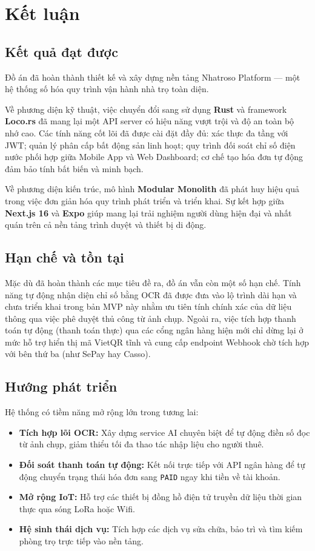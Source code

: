 \chapter{Kết luận}\label{chapter_conclusion}

\section{Kết quả đạt được}

Đồ án đã hoàn thành thiết kế và xây dựng nền tảng Nhatroso Platform --- một hệ thống số hóa quy trình vận hành nhà trọ toàn diện.

Về phương diện kỹ thuật, việc chuyển đổi sang sử dụng \textbf{Rust} và framework \textbf{Loco.rs} đã mang lại một API server có hiệu năng vượt trội và độ an toàn bộ nhớ cao. Các tính năng cốt lõi đã được cài đặt đầy đủ: xác thực đa tầng với JWT; quản lý phân cấp bất động sản linh hoạt; quy trình đối soát chỉ số điện nước phối hợp giữa Mobile App và Web Dashboard; cơ chế tạo hóa đơn tự động đảm bảo tính bất biến và minh bạch.

Về phương diện kiến trúc, mô hình \textbf{Modular Monolith} đã phát huy hiệu quả trong việc đơn giản hóa quy trình phát triển và triển khai. Sự kết hợp giữa \textbf{Next.js 16} và \textbf{Expo} giúp mang lại trải nghiệm người dùng hiện đại và nhất quán trên cả nền tảng trình duyệt và thiết bị di động.

\section{Hạn chế và tồn tại}

Mặc dù đã hoàn thành các mục tiêu đề ra, đồ án vẫn còn một số hạn chế. Tính năng tự động nhận diện chỉ số bằng OCR đã được đưa vào lộ trình dài hạn và chưa triển khai trong bản MVP này nhằm ưu tiên tính chính xác của dữ liệu thông qua việc phê duyệt thủ công từ ảnh chụp. Ngoài ra, việc tích hợp thanh toán tự động (thanh toán thực) qua các cổng ngân hàng hiện mới chỉ dừng lại ở mức hỗ trợ hiển thị mã VietQR tĩnh và cung cấp endpoint Webhook chờ tích hợp với bên thứ ba (như SePay hay Casso).

\section{Hướng phát triển}

Hệ thống có tiềm năng mở rộng lớn trong tương lai:
\begin{itemize}
    \item \textbf{Tích hợp lõi OCR:} Xây dựng service AI chuyên biệt để tự động điền số đọc từ ảnh chụp, giảm thiểu tối đa thao tác nhập liệu cho người thuê.
    \item \textbf{Đối soát thanh toán tự động:} Kết nối trực tiếp với API ngân hàng để tự động chuyển trạng thái hóa đơn sang \texttt{PAID} ngay khi tiền về tài khoản.
    \item \textbf{Mở rộng IoT:} Hỗ trợ các thiết bị đồng hồ điện tử truyền dữ liệu thời gian thực qua sóng LoRa hoặc Wifi.
    \item \textbf{Hệ sinh thái dịch vụ:} Tích hợp các dịch vụ sửa chữa, bảo trì và tìm kiếm phòng trọ trực tiếp vào nền tảng.
\end{itemize}
